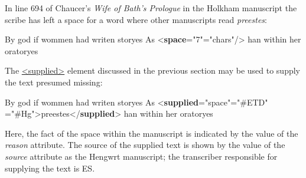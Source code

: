 In line 694 of Chaucer's \textit{Wife of Bath's Prologue} in the Holkham manuscript the scribe has left a space for a word where other manuscripts read \textit{preestes}: \par\bgroup{}\exampleFont \begin{shaded}\noindent\mbox{}By\mbox{}\newline 
 god if wommen had writen storyes As {<\textbf{space}\hspace*{1em}{quantity}="{7}"\hspace*{1em}{unit}="{chars}"/>} han within her\mbox{}\newline 
 oratoryes\end{shaded}\egroup\par \noindent  The \hyperref[TEI.supplied]{<supplied>} element discussed in the previous section may be used to supply the text presumed missing: \par\bgroup{}\exampleFont \begin{shaded}\noindent\mbox{}By god if wommen had writen storyes As\mbox{}\newline 
{<\textbf{supplied}\hspace*{1em}{reason}="{space}"\hspace*{1em}{resp}="{\#ETD}"\mbox{}\newline 
\hspace*{1em}{source}="{\#Hg}">}preestes{</\textbf{supplied}>} han within\mbox{}\newline 
 her oratoryes\end{shaded}\egroup\par \noindent  Here, the fact of the space within the manuscript is indicated by the value of the {\itshape reason} attribute. The source of the supplied text is shown by the value of the {\itshape source} attribute as the Hengwrt manuscript; the transcriber responsible for supplying the text is ES.
